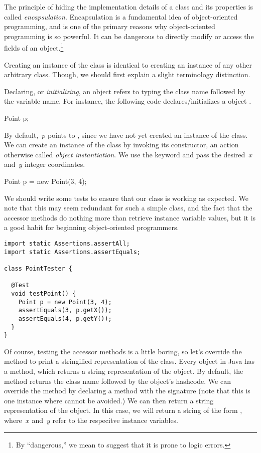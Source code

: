 The principle of hiding the implementation details of a class and its properties is called \emph{encapsulation}. 
Encapsulation is a fundamental idea of object-oriented programming, and is one of the primary reasons why object-oriented programming is so powerful. 
It can be dangerous to directly modify or access the fields of an object.\footnote{By ``dangerous,'' we mean to suggest that it is prone to logic errors.} 

Creating an instance of the  class is identical to creating an instance of any other arbitrary class.
Though, we should first explain a slight terminology distinction.

Declaring, or \emph{initializing}, an object refers to typing the class name followed by the variable name. 
For instance, the following code declares/initializes a  object .

\begin{verbnobox}[\small]
Point p;
\end{verbnobox}

By default,~$p$ points to , since we have not yet created an instance of the  class. 
We can create an instance of the  class by invoking its constructor, an action otherwise called \emph{object instantiation}. 
We use the  keyword and pass the desired~$x$ and~$y$ integer coordinates. 

\begin{verbnobox}[\small]
Point p = new Point(3, 4);
\end{verbnobox}

We should write some tests to ensure that our  class is working as expected. 
We note that this may seem redundant for such a simple class, and the fact that the accessor methods do nothing more than retrieve instance variable values, but it is a good habit for beginning object-oriented programmers.

\begin{lstlisting}[language=MyJava]
import static Assertions.assertAll;
import static Assertions.assertEquals;

class PointTester {
  
  @Test
  void testPoint() {
    Point p = new Point(3, 4);
    assertEquals(3, p.getX());
    assertEquals(4, p.getY());
  }
}
\end{lstlisting}

Of course, testing the accessor methods is a little boring, so let's override the  method to print a stringified representation of the  class. 
Every object in Java has a  method, which returns a string representation of the object. 
By default, the  method returns the class name followed by the object's hashcode. 
We can override the  method by declaring a method with the signature  (note that this is one instance where  cannot be avoided.) 
We can then return a string representation of the object. 
In this case, we will return a string of the form , where~$x$ and~$y$ refer to the respecitve instance variables. 

